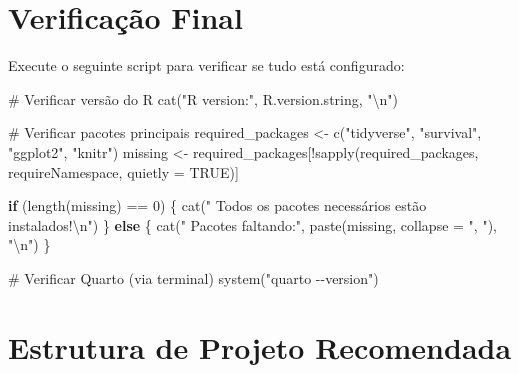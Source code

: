 \documentclass[
  letterpaper,
]{book}
\newenvironment{Shaded}{\begin{snugshade}}{\end{snugshade}}
\newcommand{\AttributeTok}[1]{\textcolor[rgb]{0.40,0.45,0.13}{#1}}
\newcommand{\CommentTok}[1]{\textcolor[rgb]{0.37,0.37,0.37}{#1}}
\newcommand{\ConstantTok}[1]{\textcolor[rgb]{0.56,0.35,0.01}{#1}}
\newcommand{\ControlFlowTok}[1]{\textcolor[rgb]{0.00,0.23,0.31}{\textbf{#1}}}
\newcommand{\DecValTok}[1]{\textcolor[rgb]{0.68,0.00,0.00}{#1}}
\newcommand{\FunctionTok}[1]{\textcolor[rgb]{0.28,0.35,0.67}{#1}}
\newcommand{\NormalTok}[1]{\textcolor[rgb]{0.00,0.23,0.31}{#1}}
\newcommand{\OtherTok}[1]{\textcolor[rgb]{0.00,0.23,0.31}{#1}}
\newcommand{\SpecialCharTok}[1]{\textcolor[rgb]{0.37,0.37,0.37}{#1}}
\newcommand{\StringTok}[1]{\textcolor[rgb]{0.13,0.47,0.30}{#1}}
\begin{document}
\section*{Verificação Final}\label{verificauxe7uxe3o-final}


Execute o seguinte script para verificar se tudo está configurado:

\begin{Shaded}
\begin{Highlighting}[]
\CommentTok{\# Verificar versão do R}
\FunctionTok{cat}\NormalTok{(}\StringTok{"R version:"}\NormalTok{, R.version.string, }\StringTok{"}\SpecialCharTok{\textbackslash{}n}\StringTok{"}\NormalTok{)}

\CommentTok{\# Verificar pacotes principais}
\NormalTok{required\_packages }\OtherTok{\textless{}{-}} \FunctionTok{c}\NormalTok{(}\StringTok{"tidyverse"}\NormalTok{, }\StringTok{"survival"}\NormalTok{, }\StringTok{"ggplot2"}\NormalTok{, }\StringTok{"knitr"}\NormalTok{)}
\NormalTok{missing }\OtherTok{\textless{}{-}}\NormalTok{ required\_packages[}\SpecialCharTok{!}\FunctionTok{sapply}\NormalTok{(required\_packages, requireNamespace, }\AttributeTok{quietly =} \ConstantTok{TRUE}\NormalTok{)]}

\ControlFlowTok{if}\NormalTok{ (}\FunctionTok{length}\NormalTok{(missing) }\SpecialCharTok{==} \DecValTok{0}\NormalTok{) \{}
    \FunctionTok{cat}\NormalTok{(}\StringTok{" Todos os pacotes necessários estão instalados!}\SpecialCharTok{\textbackslash{}n}\StringTok{"}\NormalTok{)}
\NormalTok{\} }\ControlFlowTok{else}\NormalTok{ \{}
    \FunctionTok{cat}\NormalTok{(}\StringTok{" Pacotes faltando:"}\NormalTok{, }\FunctionTok{paste}\NormalTok{(missing, }\AttributeTok{collapse =} \StringTok{", "}\NormalTok{), }\StringTok{"}\SpecialCharTok{\textbackslash{}n}\StringTok{"}\NormalTok{)}
\NormalTok{\}}

\CommentTok{\# Verificar Quarto (via terminal)}
\FunctionTok{system}\NormalTok{(}\StringTok{"quarto {-}{-}version"}\NormalTok{)}
\end{Highlighting}
\end{Shaded}

\section*{Estrutura de Projeto
Recomendada}\label{estrutura-de-projeto-recomendada}
\end{document}
